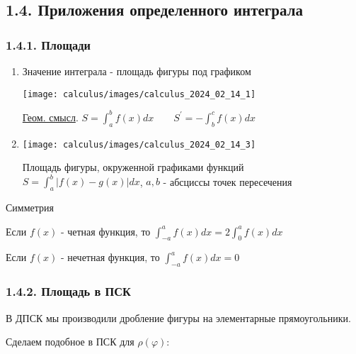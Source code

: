 \documentclass[12pt]{article}
\begin{document}
    \subsection{1.4. Приложения определенного интеграла}
    \hypertarget{integralapplications}{}

    \subsubsection{1.4.1. Площади}

    \begin{enumerate}[label*=\arabic** ]
        \item \Mem \hypertarget{integralareadpsk}{Значение интеграла} - площадь фигуры под графиком

        \begin{center}
            \texttt{[image: calculus/images/calculus\_2024\_02\_14\_1]}
        \end{center}

        \underline{Геом. смысл}. $S = \int_a^b f(x) dx \quad\quad S^\prime = -\int_b^c f(x)dx$

        \mediumvspace

        \item

        \begin{center}
            \texttt{[image: calculus/images/calculus\_2024\_02\_14\_3]}
        \end{center}

        Площадь фигуры, окруженной графиками функций $S = \int_a^b |f(x) - g(x)| dx$, $a, b$ - абсциссы точек пересечения
    \end{enumerate}

    \Nota Симметрия

    Если $f(x)$ - четная функция, то $\int_{-a}^a f(x) dx = 2 \int_0^a f(x)dx$

    Если $f(x)$ - нечетная функция, то $\int_{-a}^a f(x) dx = 0$

    \subsubsection{1.4.2. Площадь в ПСК}

    \hypertarget{integralareapsk}{В ДПСК мы производили дробление фигуры на элементарные прямоугольники.} Сделаем подобное в ПСК для $\rho(\varphi)$:
\end{document}

